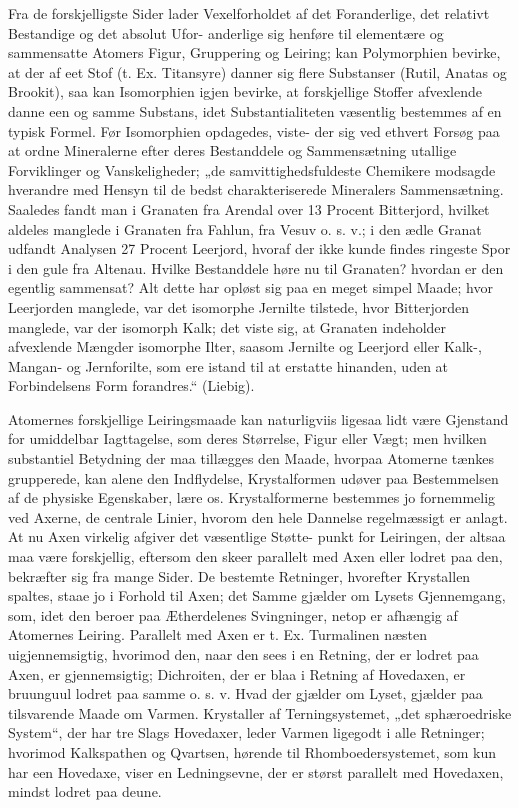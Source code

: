 \documentclass[12pt,a4paper]{book}
\begin{document}
Fra de forskjelligste Sider lader Vexelforholdet af det
Foranderlige, det relativt Bestandige og det absolut Ufor-
anderlige sig henføre til elementære og sammensatte Atomers
Figur, Gruppering og Leiring; kan Polymorphien bevirke, at
der af eet Stof (t. Ex. Titansyre) danner sig flere
Substanser (Rutil, Anatas og Brookit), saa kan Isomorphien
igjen bevirke, at forskjellige Stoffer afvexlende danne
een og samme Substans, idet Substantialiteten væsentlig
bestemmes af en typisk Formel. Før Isomorphien
opdagedes, viste- der sig ved ethvert Forsøg paa at ordne
Mineralerne efter deres Bestanddele og Sammensætning
utallige Forviklinger og Vanskeligheder; „de samvittighedsfuldeste
Chemikere modsagde hverandre med Hensyn til de
bedst charakteriserede Mineralers Sammensætning. Saaledes
fandt man i Granaten fra Arendal over 13 Procent
Bitterjord, hvilket aldeles manglede i Granaten fra Fahlun,
fra Vesuv o. s. v.; i den ædle Granat udfandt Analysen 27
Procent Leerjord, hvoraf der ikke kunde findes ringeste Spor
i den gule fra Altenau. Hvilke Bestanddele høre nu til
Granaten? hvordan er den egentlig sammensat? Alt dette
har opløst sig paa en meget simpel Maade; hvor Leerjorden
manglede, var det isomorphe Jernilte tilstede, hvor
Bitterjorden manglede, var der isomorph Kalk; det viste sig, at
Granaten indeholder afvexlende Mængder isomorphe Ilter,
saasom Jernilte og Leerjord eller Kalk-, Mangan- og
Jernforilte, som ere istand til at erstatte hinanden, uden at
Forbindelsens Form forandres.“ (Liebig).

Atomernes forskjellige Leiringsmaade kan naturligviis
ligesaa lidt være Gjenstand for umiddelbar Iagttagelse, som
deres Størrelse, Figur eller Vægt; men hvilken substantiel
Betydning der maa tillægges den Maade, hvorpaa Atomerne
tænkes grupperede, kan alene den Indflydelse, Krystalformen
udøver paa Bestemmelsen af de physiske Egenskaber, lære os.
Krystalformerne bestemmes jo fornemmelig ved Axerne, de
centrale Linier, hvorom den hele Dannelse regelmæssigt er
anlagt. At nu Axen virkelig afgiver det væsentlige Støtte-
punkt for Leiringen, der altsaa maa være forskjellig, eftersom
den skeer parallelt med Axen eller lodret paa den, bekræfter
sig fra mange Sider. De bestemte Retninger, hvorefter
Krystallen spaltes, staae jo i Forhold til Axen; det Samme
gjælder om Lysets Gjennemgang, som, idet den beroer paa
Ætherdelenes Svingninger, netop er afhængig af Atomernes
Leiring. Parallelt med Axen er t. Ex. Turmalinen næsten
uigjennemsigtig, hvorimod den, naar den sees i en Retning,
der er lodret paa Axen, er gjennemsigtig; Dichroiten, der er
blaa i Retning af Hovedaxen, er bruunguul lodret paa samme
o. s. v. Hvad der gjælder om Lyset, gjælder paa tilsvarende
Maade om Varmen. Krystaller af Terningsystemet, „det
sphæroedriske System“, der har tre Slags Hovedaxer, leder
Varmen ligegodt i alle Retninger; hvorimod Kalkspathen og
Qvartsen, hørende til Rhomboedersystemet, som kun har een
Hovedaxe, viser en Ledningsevne, der er størst parallelt med
Hovedaxen, mindst lodret paa deune.
\end{document}
